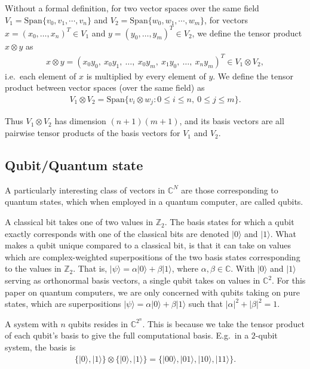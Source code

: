 \documentclass[11pt]{article}
\begin{document}
Without a formal definition, for two vector spaces over the same field $V_1 = \text{Span}\{v_0, v_1, \cdots, v_n\}$ and $V_2 = \text{Span}\{w_0, w_1, \cdots, w_m\}$, for vectors $x = (x_0, \ldots, x_n)^T \in V_1$ and $y = (y_0, \ldots, y_m)^T \in V_2$, we define the tensor product $x \otimes y$ as
\begin{align*}
x \otimes y = (x_0 y_0,\ x_0 y_1,\ \ldots,\ x_0 y_m,\ x_1 y_0,\ \ldots,\ x_n y_m)^T \in V_1 \otimes V_2,
\end{align*}
i.e.\ each element of $x$ is multiplied by every element of $y$. We define the tensor product between vector spaces (over the same field) as
\begin{align*}
V_1 \otimes V_2 = \text{Span}\{v_i \otimes w_j : 0 \leq i \leq n,\ 0 \leq j \leq m\}.
\end{align*}

Thus $V_1 \otimes V_2$ has dimension $(n+1)(m+1)$, and its basis vectors are all pairwise tensor products of the basis vectors for $V_1$ and $V_2$.

\subsection{Qubit/Quantum state}

A particularly interesting class of vectors in $\mathbb{C}^N$ are those corresponding to quantum states, which when employed in a quantum computer, are called qubits.

A classical bit takes one of two values in $\mathbb{Z}_2$. The basis states for which a qubit exactly corresponds with one of the classical bits are denoted $\vert 0 \rangle$ and $\vert 1 \rangle$. What makes a qubit unique compared to a classical bit, is that it can take on values which are complex-weighted superpositions of the two basis states corresponding to the values in $\mathbb{Z}_2$. That is, $\vert \psi \rangle = \alpha \vert 0 \rangle + \beta \vert 1 \rangle$, where $\alpha, \beta \in \mathbb{C}$. With $\vert 0 \rangle$ and $\vert 1 \rangle$ serving as orthonormal basis vectors, a single qubit takes on values in $\mathbb{C}^2$. For this paper on quantum computers, we are only concerned with qubits taking on pure states, which are superpositions $\vert \psi \rangle = \alpha \vert 0 \rangle + \beta \vert 1 \rangle$ such that $|\alpha|^2 + |\beta|^2 = 1$.

A system with $n$ qubits resides in $\mathbb{C}^{2^n}$. This is because we take the tensor product of each qubit's basis to give the full computational basis. E.g.\ in a $2$-qubit system, the basis is
\begin{align*}
\{\vert 0 \rangle, \vert 1 \rangle\} \otimes \{\vert 0 \rangle, \vert 1 \rangle\} = \{\vert 00\rangle, \vert 01\rangle, \vert 10\rangle, \vert 11\rangle\}.
\end{align*}
\end{document}
